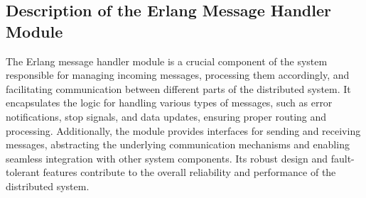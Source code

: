 \subsection{Description of the Erlang Message Handler Module}
The Erlang message handler module is a crucial component of the system responsible for managing incoming messages, processing them accordingly, and facilitating communication between different parts of the distributed system. It encapsulates the logic for handling various types of messages, such as error notifications, stop signals, and data updates, ensuring proper routing and processing. Additionally, the module provides interfaces for sending and receiving messages, abstracting the underlying communication mechanisms and enabling seamless integration with other system components. Its robust design and fault-tolerant features contribute to the overall reliability and performance of the distributed system.